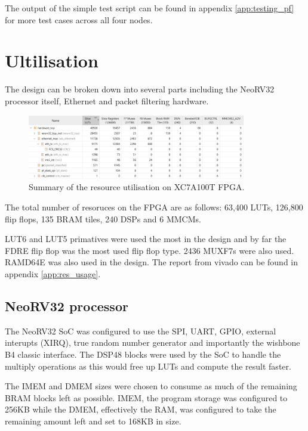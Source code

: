 The output of the simple test script can be found in appendix \ref{app:testing_pf} for more test cases across all four nodes.


\section{Ultilisation}

The design can be broken down into several parts including the NeoRV32 processor itself, Ethernet and packet filtering hardware.

\begin{figure}[h]
    \centering
    \includegraphics[width=0.85\textwidth]{Images/FPGAUtilisationResources.png}
    \caption[Summary of the resource utilisation on XC7A100T FPGA]{Summary of the resource utilisation on XC7A100T FPGA.}
    \label{fig:eye_diagram}
\end{figure}

The total number of resoruces on the FPGA are as follows: 63,400 LUTs, 126,800 flip flops, 135 BRAM tiles, 240 DSPs and 6 MMCMs.

LUT6 and LUT5 primatives were used the most in the design and by far the FDRE flip flop was the most used flip flop type. 2436 MUXF7s were also used. RAMD64E was also used in the design. The report from vivado can be found in appendix \ref{app:res_usage}.

\subsection{NeoRV32 processor}

The NeoRV32 SoC was configured to use the SPI, UART, GPIO, external interupts (XIRQ), true random number generator and importantly the wishbone B4 classic interface. The DSP48 blocks were used by the SoC to handle the multiply operations as this would free up LUTs and compute the result faster. 

The IMEM and DMEM sizes were chosen to consume as much of the remaining BRAM blocks left as possible. IMEM, the program storage was configured to 256KB while the DMEM, effectively the RAM, was configured to take the remaining amount left and set to 168KB in size. 

